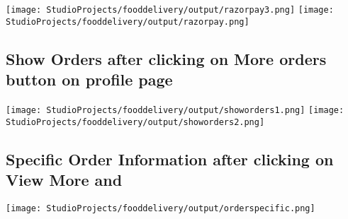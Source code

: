 \vspace{10pt}

\texttt{[image: StudioProjects/fooddelivery/output/razorpay3.png]}
\hfill
\texttt{[image: StudioProjects/fooddelivery/output/razorpay.png]}

\vspace{15pt}

\subsection{Show Orders after clicking on More orders button on profile page}
\texttt{[image: StudioProjects/fooddelivery/output/showorders1.png]}
\hfill
\texttt{[image: StudioProjects/fooddelivery/output/showorders2.png]}



\subsection{Specific Order Information after clicking on View More and }

\texttt{[image: StudioProjects/fooddelivery/output/orderspecific.png]}


